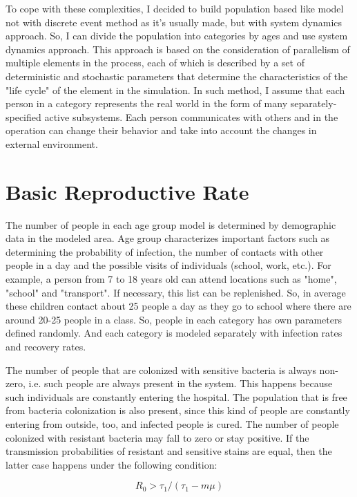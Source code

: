 To cope with these complexities, I decided to build population based like model not with discrete event method as it’s usually made, but with system dynamics approach. So, I can divide the population into categories by ages and use system dynamics approach. This approach is based on the consideration of parallelism of multiple elements in the process, each of which is described by a set of deterministic and stochastic parameters that determine the characteristics of the "life cycle" of the element in the simulation. In such method, I assume that each person in a category represents the real world in the form of many separately-specified active subsystems. Each person communicates with others and in the operation can change their behavior and take into account the changes in external environment.

\section{Basic Reproductive Rate}

The number of people in each age group model is determined by demographic data in the modeled area. Age group characterizes important factors such as determining the probability of infection, the number of contacts with other people in a day and the possible visits of individuals (school, work, etc.). For example, a person from 7 to 18 years old can attend locations such as "home", "school" and "transport". If necessary, this list can be replenished. So, in average these children contact about 25 people a day as they go to school where there are around 20-25 people in a class.  So, people in each category has own parameters defined randomly. And each category is modeled separately with infection rates and recovery rates.

The number of people that are colonized with sensitive bacteria is always non-zero, i.e. such people are always present in the system. This happens because such individuals are constantly entering the hospital. The population that is free from bacteria colonization is also present, since this kind of people are constantly entering from outside, too, and infected people is cured. The number of people colonized with resistant bacteria may fall to zero or stay positive. If the transmission probabilities of resistant and sensitive stains are equal, then the latter case happens under the following condition:

\begin{equation}
R_0 > \tau_1/(\tau_1 - m \mu)
\end{equation}

